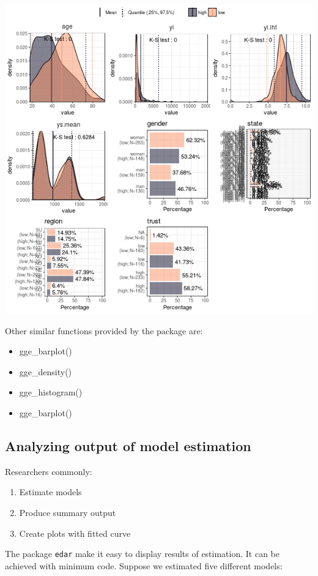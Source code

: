 \documentclass[a4paper]{article}
\begin{document}
\begin{center}
\includegraphics[width=.9\linewidth]{gge_describe_group.png}
\end{center}


Other similar functions provided by the package are:
\begin{itemize}
\item gge\_barplot()
\item gge\_density()
\item gge\_histogram()
\item gge\_barplot()
\end{itemize}
\subsection{Analyzing output of model estimation}
\label{sec:orgd80eda5}

Researchers commonly:
\begin{enumerate}
\item Estimate models
\item Produce summary output
\item Create plots with fitted curve
\end{enumerate}

The package \texttt{edar} make it easy to display results of estimation. It can be achieved with minimum code. Suppose we estimated five different models:
\end{document}
